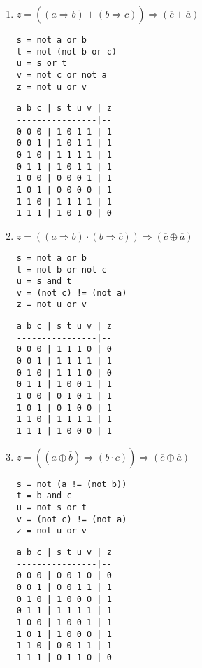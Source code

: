 \documentclass[11pt,a4paper]{article}
\begin{document}
\begin{enumerate}  
\item $z = ((a \Rightarrow b) + \overline{(b \Rightarrow c)}) \Rightarrow (\overline{c} + \overline{a})$ 
\hfill
\begin{minipage}[t]{4cm}\footnotesize
\begin{Verbatim}
s = not a or b
t = not (not b or c)
u = s or t
v = not c or not a   
z = not u or v
\end{Verbatim}
\end{minipage}
\hspace*{3mm}
\begin{minipage}[t]{3.5cm}\footnotesize
\begin{Verbatim}
a b c | s t u v | z
----------------|--
0 0 0 | 1 0 1 1 | 1
0 0 1 | 1 0 1 1 | 1
0 1 0 | 1 1 1 1 | 1
0 1 1 | 1 0 1 1 | 1
1 0 0 | 0 0 0 1 | 1
1 0 1 | 0 0 0 0 | 1
1 1 0 | 1 1 1 1 | 1
1 1 1 | 1 0 1 0 | 0
\end{Verbatim}
\end{minipage}
\vspace*{3mm}

\item $z = ((a \Rightarrow b) \cdot (b \Rightarrow \overline{c})) \Rightarrow (\overline{c} \oplus \overline{a})$
\hfill
\begin{minipage}[t]{4cm}\footnotesize
\begin{Verbatim}
s = not a or b
t = not b or not c
u = s and t
v = (not c) != (not a)
z = not u or v
\end{Verbatim}
\end{minipage}
\hspace*{3mm}
\begin{minipage}[t]{3.5cm}\footnotesize
\begin{Verbatim}
a b c | s t u v | z
----------------|--
0 0 0 | 1 1 1 0 | 0
0 0 1 | 1 1 1 1 | 1
0 1 0 | 1 1 1 0 | 0
0 1 1 | 1 0 0 1 | 1
1 0 0 | 0 1 0 1 | 1
1 0 1 | 0 1 0 0 | 1
1 1 0 | 1 1 1 1 | 1
1 1 1 | 1 0 0 0 | 1
\end{Verbatim}
\end{minipage}
\vspace*{3mm}

\item $z = (\overline{(a \oplus \overline{b})} \Rightarrow (b \cdot c)) \Rightarrow (\overline{c} \oplus \overline{a})$
\hfill
\begin{minipage}[t]{4cm}\footnotesize
\begin{Verbatim}
s = not (a != (not b))
t = b and c
u = not s or t
v = (not c) != (not a)
z = not u or v
\end{Verbatim}
\end{minipage}
\hspace*{3mm}
\begin{minipage}[t]{3.5cm}\footnotesize
\begin{Verbatim}
a b c | s t u v | z
----------------|--
0 0 0 | 0 0 1 0 | 0
0 0 1 | 0 0 1 1 | 1
0 1 0 | 1 0 0 0 | 1
0 1 1 | 1 1 1 1 | 1
1 0 0 | 1 0 0 1 | 1
1 0 1 | 1 0 0 0 | 1
1 1 0 | 0 0 1 1 | 1
1 1 1 | 0 1 1 0 | 0
\end{Verbatim}
\end{minipage}
\vspace*{3mm}


\end{enumerate}
\end{document}
